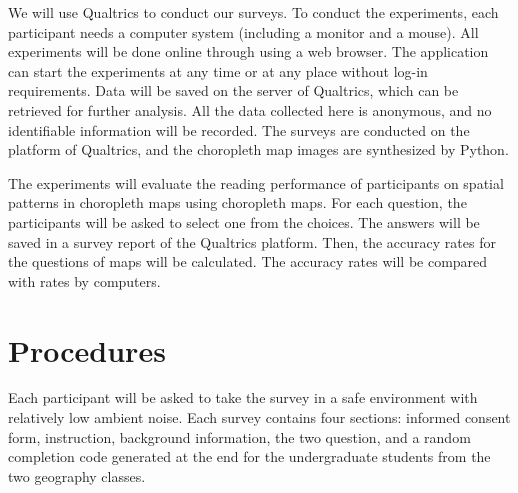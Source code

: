 We will use Qualtrics to conduct our surveys. To conduct the experiments, each participant needs a computer system (including a monitor and a mouse). All experiments will be done online through using a web browser. The application can start the experiments at any time or at any place without log-in requirements. Data will be saved on the server of Qualtrics, which can be retrieved for further analysis. All the data collected here is anonymous, and no identifiable information will be recorded. The surveys are conducted on the platform of Qualtrics, and the choropleth map images are synthesized by Python. 

The experiments will evaluate the reading performance of participants on spatial patterns in choropleth maps using choropleth maps. For each question, the participants will be asked to select one from the choices. The answers will be saved in a survey report of the Qualtrics platform. Then, the accuracy rates for the questions of maps will be calculated. The accuracy rates will be compared with rates by computers.

\section{Procedures}

Each participant will be asked to take the survey in a safe environment with relatively low ambient noise. Each survey contains four sections: informed consent form, instruction, background information, the two question, and a random completion code generated at the end for the undergraduate students from the two geography classes.

